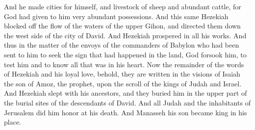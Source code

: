 \begin{biblechapter}
\verse And he made cities for himself, and livestock of sheep and abundant cattle, for God had given to him very abundant possessions.
\verse And this same Hezekiah blocked off the flow of the waters of the upper Gihon, and directed them down the west side of the city of David. And Hezekiah prospered in all his works.
\verse And thus in the matter of the envoys of the commanders of Babylon who had been sent to him to seek the sign that had happened in the land, God forsook him, to test him and to know all that was in his heart.
\verse Now the remainder of the words of Hezekiah and his loyal love, behold, they are written in the visions of Isaiah the son of Amoz, the prophet, upon the scroll of the kings of Judah and Israel.
\verse And Hezekiah slept with his ancestors, and they buried him in the upper part of the burial sites of the descendants of David. And all Judah and the inhabitants of Jerusalem did him honor at his death. And Manasseh his son became king in his place.
\end{biblechapter}

